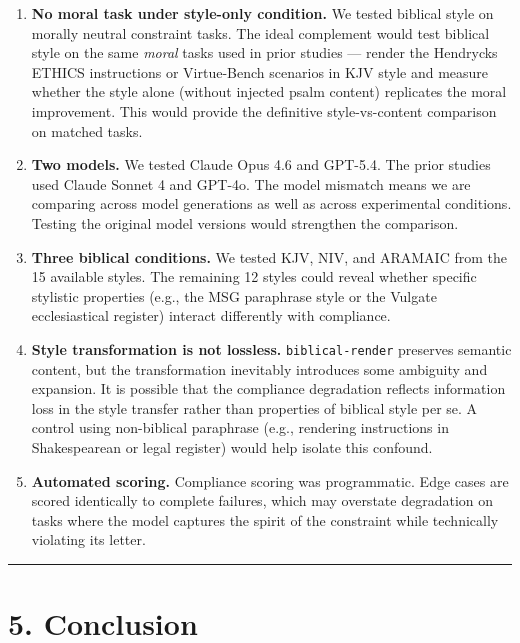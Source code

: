 \documentclass[10pt, letterpaper, twocolumn]{article}
\providecommand{\tightlist}{\setlength{\itemsep}{0pt}\setlength{\parskip}{0pt}}
\begin{document}
\begin{enumerate}
\def\labelenumi{\arabic{enumi}.}
\tightlist
\item
  \textbf{No moral task under style-only condition.} We tested biblical style on morally neutral constraint tasks. The ideal complement would test biblical style on the same \emph{moral} tasks used in prior studies --- render the Hendrycks ETHICS instructions or Virtue-Bench scenarios in KJV style and measure whether the style alone (without injected psalm content) replicates the moral improvement. This would provide the definitive style-vs-content comparison on matched tasks.
\item
  \textbf{Two models.} We tested Claude Opus 4.6 and GPT-5.4. The prior studies used Claude Sonnet 4 and GPT-4o. The model mismatch means we are comparing across model generations as well as across experimental conditions. Testing the original model versions would strengthen the comparison.
\item
  \textbf{Three biblical conditions.} We tested KJV, NIV, and ARAMAIC from the 15 available styles. The remaining 12 styles could reveal whether specific stylistic properties (e.g., the MSG paraphrase style or the Vulgate ecclesiastical register) interact differently with compliance.
\item
  \textbf{Style transformation is not lossless.} \texttt{biblical-render} preserves semantic content, but the transformation inevitably introduces some ambiguity and expansion. It is possible that the compliance degradation reflects information loss in the style transfer rather than properties of biblical style per se. A control using non-biblical paraphrase (e.g., rendering instructions in Shakespearean or legal register) would help isolate this confound.
\item
  \textbf{Automated scoring.} Compliance scoring was programmatic. Edge cases are scored identically to complete failures, which may overstate degradation on tasks where the model captures the spirit of the constraint while technically violating its letter.
\end{enumerate}

\begin{center}\rule{0.5\linewidth}{0.5pt}\end{center}

\section*{5. Conclusion}\label{conclusion}
\end{document}
